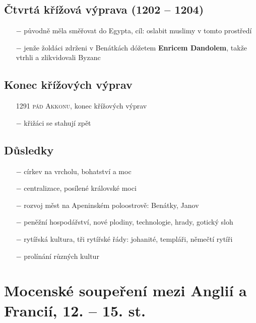 \documentclass{article}
\begin{document}
\subsection*{Čtvrtá křížová výprava (1202 -- 1204)}
\begin{itemize}
    \vspace{-0.5em}
    \setlength\itemsep{0.15em}
    \item[$-$] původně měla směřovat do Egypta, cíl: oslabit muslimy v tomto prostředí
    \item[$-$] jenže žoldáci zdrženi v Benátkách dóžetem \textbf{Enricem Dandolem}, takže vtrhli a zlikvidovali Byzanc
\end{itemize}


\subsection*{Konec křížových výprav}
\begin{itemize}
    \vspace{-0.5em}
    \setlength\itemsep{0.15em}
    \item[1291] \textsc{pád Akkonu}, konec křížových výprav
    \item[$-$] křižáci se stahují zpět
\end{itemize}


\subsection*{Důsledky}
\begin{itemize}
    \vspace{-0.5em}
    \setlength\itemsep{0.15em}
    \item[$-$] církev na vrcholu, bohatství a moc
    \item[$-$] centralizace, posílené královské moci
    \item[$-$] rozvoj měst na Apeninském poloostrově: Benátky, Janov
    \item[$-$] peněžní hospodářství, nové plodiny, technologie, hrady, gotický sloh
    \item[$-$] rytířská kultura, tři rytířské řády: johanité, templáři, němečtí rytíři
    \item[$-$] prolínání různých kultur
\end{itemize}


\section*{Mocenské soupeření mezi Anglií a Francií, 12. -- 15. st.}
\end{document}
